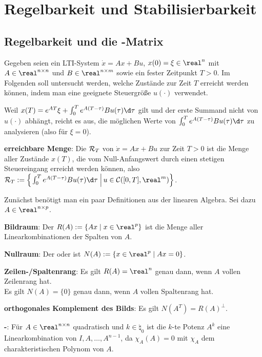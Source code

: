\chapter{%
    Regelbarkeit und Stabilisierbarkeit%
}

\section{%
    Regelbarkeit und die -Matrix%
}

Gegeben seien ein LTI-System $\dot{x} = Ax + Bu$, $x(0) = \xi \in \real^n$
mit $A \in \real^{n \times n}$ und $B \in \real^{n \times m}$
sowie ein fester Zeitpunkt $T > 0$.
Im Folgenden soll untersucht werden, welche Zustände zur Zeit $T$ erreicht werden können,
indem man eine geeignete Steuergröße $u(\cdot)$ verwendet.

Weil $x(T) = e^{AT} \xi + \int_0^T e^{A(T - \tau)} Bu(\tau) \d\tau$ gilt
und der erste Summand nicht von $u(\cdot)$ abhängt, reicht es aus, die möglichen Werte
von $\int_0^T e^{A(T - \tau)} Bu(\tau)\d\tau$ zu analysieren
(also für $\xi = 0$).

\textbf{erreichbare Menge}:
Die  $\mathcal{R}_T$ von $\dot{x} = Ax + Bu$ zur Zeit $T > 0$
ist die Menge aller Zustände $x(T)$, die vom Null-Anfangswert durch einen stetigen Steuereingang
erreicht werden können,
also $\R_T := \left\{\left.\int_0^T e^{A(T - \tau)} Bu(\tau)\d\tau \;\right|
u \in \C([0, T], \real^m)\right\}$.

\linie

Zunächst benötigt man ein paar Definitionen aus der linearen Algebra.
Sei dazu $A \in \real^{n \times p}$.

\textbf{Bildraum}:
Der  $R(A) := \{Ax \;|\; x \in \real^p\}$ ist die Menge
aller Linearkombinationen der Spalten von $A$.

\textbf{Nullraum}:
Der  oder  ist
$N(A) := \{x \in \real^p \;|\; Ax = 0\}$.

\textbf{Zeilen-/Spaltenrang}:
Es gilt $R(A) = \real^n$ genau dann, wenn $A$ vollen Zeilenrang hat.\\
Es gilt $N(A) = \{0\}$ genau dann, wenn $A$ vollen Spaltenrang hat.

\textbf{orthogonales Komplement des Bilds}:
Es gilt $N(A^T) = R(A)^\bot$.

\textbf{-}:
Für $A \in \real^{n \times n}$ quadratisch und $k \in \natural_0$
ist die $k$-te Potenz $A^k$ eine Linearkombination von $I, A, \dotsc, A^{n-1}$,
da $\chi_A(A) = 0$ mit $\chi_A$ dem charakteristischen Polynom von $A$.

